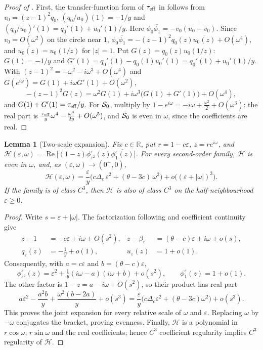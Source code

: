 \documentclass[11pt]{article}
\newtheorem{lemma}[theorem]{Lemma}
\theoremstyle{definition}
\theoremstyle{remark}
\newcommand{\R}{\mathbb R}
\newcommand{\Rea}{\operatorname{Re}}
\newcommand{\teff}{\tau_{\rm eff}}
\begin{document}
\begin{proof}[Proof of ]
First, the transfer-function form of \(\teff\) in  follows from \(v_0=(z-1)^2q_0\), \((q_0/u_0)(1)=-1/y\) and
\((q_0/u_0)'(1)=q_0'(1)+u_0'(1)/y\).  Here \(\phi_0\overline{\phi_1}=-v_0\overline{(u_0-v_0)}\).  Since \(v_0=O(\omega^2)\) on the circle near \(1\),
\(\phi_0\overline{\phi_1}=-(z-1)^2q_0(z)\overline{u_0(z)}+O(\omega^4)\), and \(\overline{u_0(z)}=u_0(1/z)\) for \(|z|=1\).  Put
\(G(z)=q_0(z)u_0(1/z)\): \(G(1)=-1/y\) and \(G'(1)=q_0'(1)-q_0(1)u_0'(1)=q_0'(1)+u_0'(1)/y\).  With
\((z-1)^2=-\omega^2-i\omega^3+O(\omega^4)\) and \(G(e^{i\omega})=G(1)+i\omega G'(1)+O(\omega^2)\),
\[
-(z-1)^2G(z)=\omega^2G(1)+i\omega^3\bigl(G(1)+G'(1)\bigr)+O(\omega^4),
\]
and \(G(1)+G'(1)=\teff/y\).  For \(\mathcal S_0\), multiply by \(1-e^{i\omega}=-i\omega+\frac{\omega^2}2+O(\omega^3)\): the real part is
\(\frac{\teff}y\omega^4-\frac{\omega^4}{2y}+O(\omega^5)\), and \(\mathcal S_0\) is even in \(\omega\), since the coefficients are real.
\end{proof}

\begin{lemma}[Two-scale expansion]\label{lem:twoscale}
Fix \(c\in\R\), put \(r=1-c\varepsilon\), \(z=re^{i\omega}\), and
\(\mathcal H(\varepsilon,\omega)=\Rea\bigl[(1-z)\phi^\varepsilon_{\varepsilon^2}(z)\overline{\phi^\varepsilon_1(z)}\bigr]\).
For every second-order family, \(\mathcal H\) is even in \(\omega\), and, as \((\varepsilon,\omega)\to(0^+,0)\),
\[
\mathcal H(\varepsilon,\omega)=\frac\varepsilon y\bigl(c\Delta_c\,\varepsilon^2+(\theta-3c)\,\omega^2\bigr)+o\bigl((\varepsilon+|\omega|)^3\bigr).
\]
If the family is of class \(C^3\), then \(\mathcal H\) is also of class \(C^3\) on the half-neighbourhood \(\varepsilon\ge0\).
\end{lemma}

\begin{proof}
Write \(s=\varepsilon+|\omega|\).  The factorization following  and coefficient continuity give
\begin{align*}
z-1&=-c\varepsilon+i\omega+O(s^2),&
z-\beta_\varepsilon&=(\theta-c)\varepsilon+i\omega+o(s),\\
q_\varepsilon(z)&=-\frac1y+o(1),& u_\varepsilon(z)&=1+o(1).
\end{align*}
Consequently, with \(a=c\varepsilon\) and \(b=(\theta-c)\varepsilon\),
\[
\phi^\varepsilon_{\varepsilon^2}(z)
=\varepsilon^2+\tfrac1y(i\omega-a)(i\omega+b)+o(s^2),\qquad
\phi^\varepsilon_1(z)=1+o(1).
\]
The other factor is \(1-z=a-i\omega+O(s^2)\), so their product has real part
\[
a\varepsilon^2-\frac{a^2b}{y}+\frac{\omega^2(b-2a)}y+o(s^3)
=\frac\varepsilon y\bigl(c\Delta_c\varepsilon^2+(\theta-3c)\omega^2\bigr)+o(s^3).
\]
This proves the joint expansion for every relative scale of \(\omega\) and \(\varepsilon\).
Replacing \(\omega\) by \(-\omega\) conjugates the bracket, proving evenness.
Finally, \(\mathcal H\) is a polynomial in \(r\cos\omega\), \(r\sin\omega\) and the real coefficients;
hence \(C^3\) coefficient regularity implies \(C^3\) regularity of \(\mathcal H\).
\end{proof}
\end{document}
